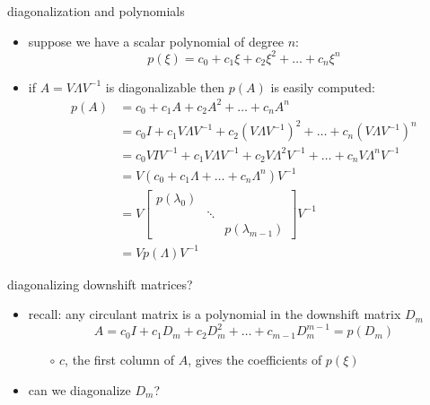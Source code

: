 \documentclass[10pt,
               svgnames,
               hyperref={colorlinks,citecolor=DeepPink4,linkcolor=FireBrick,urlcolor=Maroon},
               usepdftitle=false]{beamer}
\begin{document}
\begin{frame}{diagonalization and polynomials}

\begin{itemize}
\item suppose we have a scalar polynomial of degree $n$:
	$$p(\xi) = c_0 + c_1 \xi + c_2 \xi^2 + \dots + c_n \xi^n$$
\item if $A= V \Lambda V^{-1}$ is diagonalizable then $p(A)$ is easily computed:
\begin{align*}
p(A) &= c_0 + c_1 A + c_2 A^2 + \dots + c_n A^n \\
     &= c_0 I + c_1 V \Lambda V^{-1} + c_2 \left(V \Lambda V^{-1}\right)^2 + \dots + c_n \left(V \Lambda V^{-1}\right)^n \\
     &= c_0 V I V^{-1} + c_1 V \Lambda V^{-1} + c_2 V \Lambda^2 V^{-1} + \dots + c_n V \Lambda^n V^{-1} \\
     &= V \left(c_0 + c_1 \Lambda + \dots + c_n \Lambda^n\right) V^{-1} \\
     &= V \begin{bmatrix} p(\lambda_0) & & \\ & \ddots & \\ & & p(\lambda_{m-1}) \end{bmatrix} V^{-1} \\
     &= V p(\Lambda) V^{-1}
\end{align*}
\end{itemize}
\end{frame}


\begin{frame}{diagonalizing downshift matrices?}

\begin{itemize}
\item recall: any circulant matrix is a polynomial in the downshift matrix $D_m$
	$$A = c_0 I + c_1 D_m + c_2 D_m^2 + \dots + c_{m-1} D_m^{m-1} = p(D_m)$$

   \begin{itemize}
   \item[$\circ$] $c$, the first column of $A$, gives the coefficients of $p(\xi)$
   \end{itemize}  
\item can we diagonalize $D_m$?
\end{itemize}
\end{frame}
\end{document}

